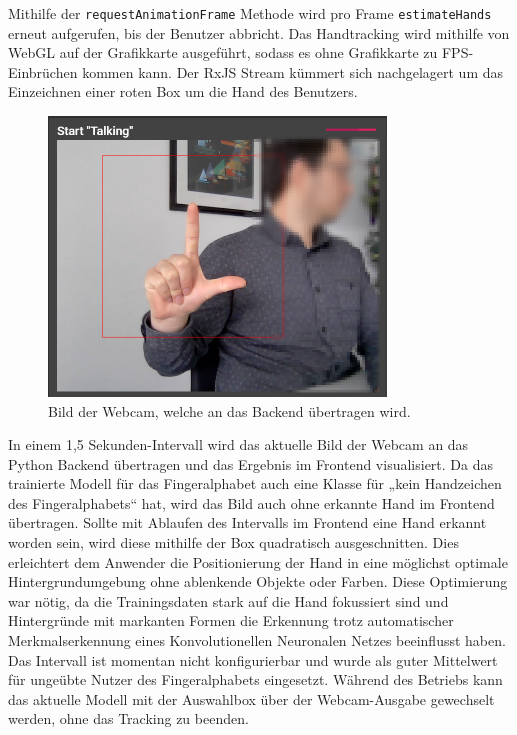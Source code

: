 \documentclass[11pt,bibliography=totocnumbered]{scrartcl}
\begin{document}
Mithilfe der \lstinline[language=pythoninline]|requestAnimationFrame| Methode wird pro Frame \lstinline[language=pythoninline]|estimateHands| erneut aufgerufen, bis der Benutzer abbricht. Das Handtracking wird mithilfe von WebGL auf der Grafikkarte ausgeführt, sodass es ohne Grafikkarte zu FPS-Einbrüchen kommen kann. Der RxJS Stream kümmert sich nachgelagert um das Einzeichnen einer roten Box um die Hand des Benutzers.
\begin{figure}[H]
	\centering
	\includegraphics[width=0.80\textwidth]{webcam_image}
	\vspace*{-3mm}
	\caption[Bild der Webcam]{Bild der Webcam, welche an das Backend übertragen wird.}
	\label{fig:webcam}
\end{figure}
In einem 1,5 Sekunden-Intervall wird das aktuelle Bild der Webcam an das Python Backend übertragen und das Ergebnis im Frontend visualisiert. Da das trainierte Modell für das Fingeralphabet auch eine Klasse für „kein Handzeichen des Fingeralphabets“ hat, wird das Bild auch ohne erkannte Hand im Frontend übertragen. Sollte mit Ablaufen des Intervalls im Frontend eine Hand erkannt worden sein, wird diese mithilfe der Box quadratisch ausgeschnitten. Dies erleichtert dem Anwender die Positionierung der Hand in eine möglichst optimale Hintergrundumgebung ohne ablenkende Objekte oder Farben. Diese Optimierung war nötig, da die Trainingsdaten stark auf die Hand fokussiert sind und Hintergründe mit markanten Formen die Erkennung trotz automatischer Merkmalserkennung eines Konvolutionellen Neuronalen Netzes beeinflusst haben. Das Intervall ist momentan nicht konfigurierbar und wurde als guter Mittelwert für ungeübte Nutzer des Fingeralphabets eingesetzt. Während des Betriebs kann das aktuelle Modell mit der Auswahlbox über der Webcam-Ausgabe gewechselt werden, ohne das Tracking zu beenden. 
\end{document}
